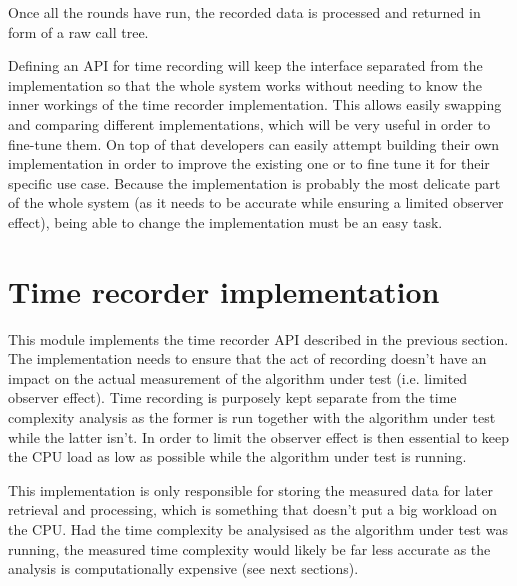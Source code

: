 \noindent Once all the rounds have run, the recorded data is processed and returned in form of a raw call tree.

\noindent Defining an API for time recording will keep the interface separated from the implementation so that the whole system works without needing to know the inner workings of the time recorder implementation. This allows easily swapping and comparing different implementations, which will be very useful in order to fine-tune them. On top of that developers can easily attempt building their own implementation in order to improve the existing one or to fine tune it for their specific use case. Because the implementation is probably the most delicate part of the whole system (as it needs to be accurate while ensuring a limited observer effect), being able to change the implementation must be an easy task.

\section{Time recorder implementation}
This module implements the time recorder API described in the previous section. The implementation needs to ensure that the act of recording doesn't have an impact on the actual measurement of the algorithm under test (i.e. limited observer effect). Time recording is purposely kept separate from the time complexity analysis as the former is run together with the algorithm under test while the latter isn't. In order to limit the observer effect is then essential to keep the CPU load as low as possible while the algorithm under test is running. 

\noindent This implementation is only responsible for storing the measured data for later retrieval and processing, which is something that doesn't put a big workload on the CPU. Had the time complexity be analysised as the algorithm under test was running, the measured time complexity would likely be far less accurate as the analysis is computationally expensive (see next sections).

